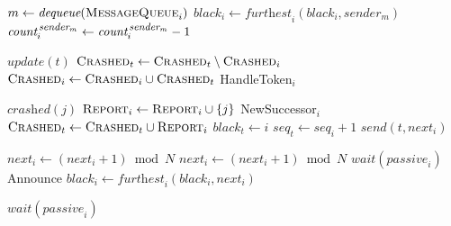 \begin{appendices}
\begin{algorithm}[ht]
	\caption{$\mbox{\rm ReceivedBasicMessage}_{\,i}$~}
	$m\leftarrow \textit{dequeue}(\textit{\sc MessageQueue}_i)$\;
	{
		{$\textit{black}_i\leftarrow\textit{furthest}_i(\textit{black}_i,\textit{sender}_m)$\;}
		$\textit{count}_i^{\,\textit{\footnotesize sender}_m} \leftarrow  \textit{count}_i^{\,\textit{\footnotesize sender}_m} - 1$\;
	}
\end{algorithm}
\begin{algorithm}[ht]
    \caption{$\mbox{\rm ReceivedToken}_{\,i}$~}
    {
    $\textit{update}(t)$\;
    $\textit{\sc Crashed}_t\leftarrow\textit{\sc Crashed}_t\setminus\textit{\sc Crashed}_i$\;
    $\textit{\sc Crashed}_i\leftarrow\textit{\sc Crashed}_i\cup\textit{\sc Crashed}_t$\;
    HandleToken$_i$\;
    }
\end{algorithm}
\begin{algorithm}[ht]
    \caption{$\mbox{\rm FailureDetector}_{\,i}$~}
    $\textit{crashed}(j)$\;
    {
    $\textit{\sc Report}_i\leftarrow\textit{\sc Report}_i\cup\{j\}$\;
    {NewSuccessor$_i$\;
    {
    $\textit{\sc Crashed}_t\leftarrow \textit{\sc Crashed}_t\cup\textit{\sc Report}_i$\;
    $\textit{black}_t\leftarrow i$\;
    {$\textit{seq}_t\leftarrow\textit{seq}_i+1$\;}
    $\textit{send}(t,\textit{next}_i)$\;
    }
    }
    }
\end{algorithm}
\begin{algorithm}[ht]
    \caption{$\mbox{\rm NewSuccessor}_{\,i}$~}{}{}
    $\textit{next}_i\leftarrow (\textit{next}_i+1)\bmod N$\;
    {$\textit{next}_i\leftarrow(\textit{next}_i+1)\bmod N$\;}
    {
    $\textit{wait}(\textit{passive}_i)$\;
    {\rm Announce}\;
    }
    {
    $\textit{black}_i\leftarrow\textit{furthest}_i(\textit{black}_i,\textit{next}_i)$\;
    }
\end{algorithm}
\begin{algorithm}[ht]
    \caption{$\mbox{\rm HandleToken}_{\,i\,}$~}
    $\textit{wait}(\textit{passive}_i)$\;

\end{algorithm}
\end{appendices}

